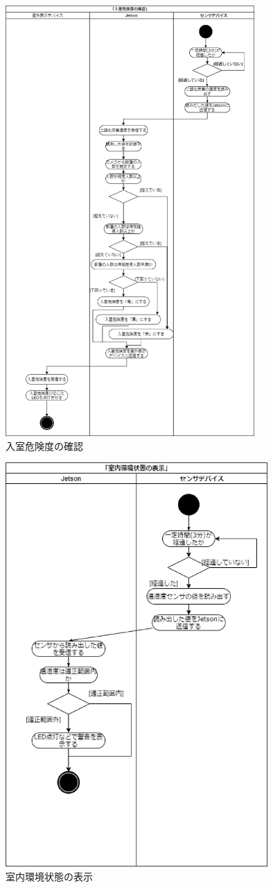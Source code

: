 \begin{figure}[H]
	\centering
	\includegraphics[width=9.5cm]{a_nyuusitu.eps}
	\caption{入室危険度の確認}
	\label{a_nyuusitu}
\end{figure}

\begin{figure}[H]
	\centering
	\includegraphics[width=10cm]{a_situnaikankyou.eps}
	\caption{室内環境状態の表示}
	\label{a_situnaikankyou}
\end{figure}

